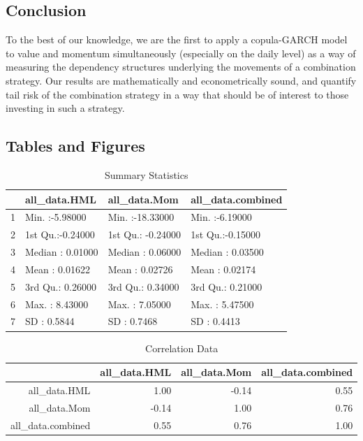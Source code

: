 \documentclass[11pt,letterpaper]{memoir}
\begin{document}
\subsection*{Conclusion}
To the best of our knowledge, we are the first to apply a copula-GARCH model to value and momentum simultaneously (especially on the daily level) as a way of measuring the dependency structures underlying the movements of a combination strategy. Our results are mathematically and econometrically sound, and quantify tail risk of the combination strategy in a way that should be of interest to those investing in such a strategy.

\newpage
\subsection*{Tables and Figures}
\begin{table}[ht]
\centering
\caption{Summary Statistics}
\begin{tabular}{rlll}
  \hline
 &  all\_data.HML &  all\_data.Mom & all\_data.combined \\ 
  \hline
1 & Min.   :-5.98000   & Min.   :-18.33000   & Min.   :-6.19000   \\ 
  2 & 1st Qu.:-0.24000   & 1st Qu.: -0.24000   & 1st Qu.:-0.15000   \\ 
  3 & Median : 0.01000   & Median :  0.06000   & Median : 0.03500   \\ 
  4 & Mean   : 0.01622   & Mean   :  0.02726   & Mean   : 0.02174   \\ 
  5 & 3rd Qu.: 0.26000   & 3rd Qu.:  0.34000   & 3rd Qu.: 0.21000   \\ 
  6 & Max.   : 8.43000   & Max.   :  7.05000   & Max.   : 5.47500   \\
  7 & SD     : 0.5844    & SD     :  0.7468    & SD     : 0.4413     \\
   \hline
\end{tabular}
\end{table}

\begin{table}[ht]
\centering
\caption{Correlation Data}
\begin{tabular}{rrrr}
  \hline
 & all\_data.HML & all\_data.Mom & all\_data.combined \\ 
  \hline
all\_data.HML & 1.00 & -0.14 & 0.55 \\ 
  all\_data.Mom & -0.14 & 1.00 & 0.76 \\ 
  all\_data.combined & 0.55 & 0.76 & 1.00 \\ 
   \hline
\end{tabular}
\end{table}
\end{document}
